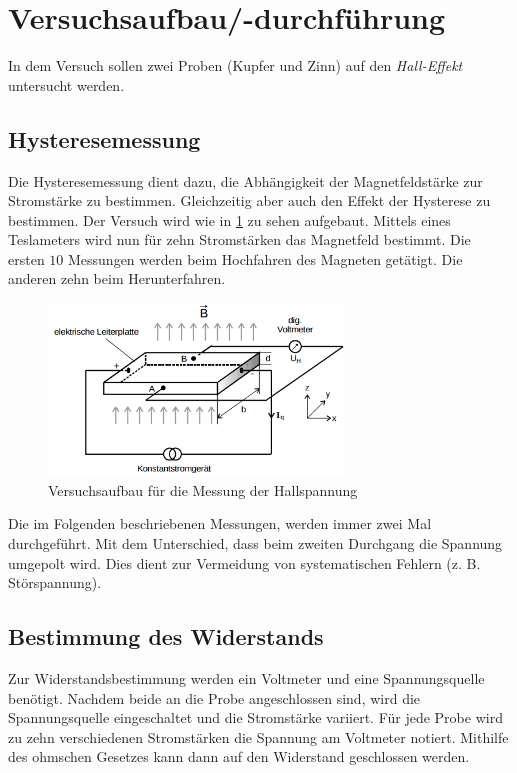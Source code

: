 \section{Versuchsaufbau/-durchführung}
In dem Versuch sollen zwei Proben (Kupfer und Zinn) auf den \emph{Hall-Effekt} untersucht werden. %

\subsection{Hysteresemessung}
Die Hysteresemessung dient dazu, die Abhängigkeit der Magnetfeldstärke
zur Stromstärke zu bestimmen. Gleichzeitig aber auch den Effekt der Hysterese %
zu bestimmen. Der Versuch wird wie in \ref{fig: auf_hall} zu sehen aufgebaut. %
Mittels eines Teslameters wird nun für zehn Stromstärken das Magnetfeld bestimmt. %
Die ersten $10$ Messungen werden beim Hochfahren des Magneten getätigt. %
Die anderen zehn beim Herunterfahren.

\begin{figure}
  \centering
  \includegraphics[width=0.7\textwidth]{pics/Halleffekt_aufbau.png}
  \caption{Versuchsaufbau für die Messung der Hallspannung}
  \label{fig: auf_hall}
\end{figure}

\begin{center}
Die im Folgenden beschriebenen Messungen, werden immer zwei Mal durchgeführt. %
Mit dem Unterschied, dass beim zweiten Durchgang die Spannung umgepolt wird. %
Dies dient zur Vermeidung von systematischen Fehlern (z. B. Störspannung). %
\end{center}

\subsection{Bestimmung des Widerstands}
Zur Widerstandsbestimmung werden ein Voltmeter und
eine Spannungsquelle benötigt.
Nachdem beide an die Probe angeschlossen sind,
wird die Spannungsquelle eingeschaltet und die Stromstärke variiert.
Für jede Probe wird zu zehn verschiedenen Stromstärken
die Spannung am Voltmeter notiert.
Mithilfe des ohmschen Gesetzes kann dann auf den Widerstand geschlossen werden.

